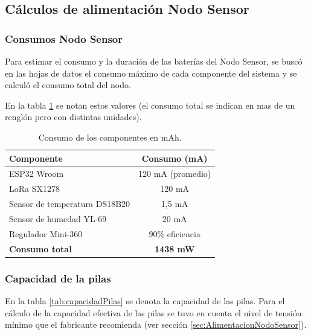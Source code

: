 \subsection{Cálculos de alimentación Nodo Sensor}
\subsubsection{Consumos Nodo Sensor}
Para estimar el consumo y la duración de las baterías del Nodo Sensor, se buscó en las hojas de datos el consumo máximo de cada componente del sistema y se calculó el consumo total del nodo. 

En la tabla \ref{tab:consumosNodo} se notan estos valores (el consumo total se indican en mas de un renglón pero con distintas unidades).


\begin{table}[h]
    \centering

    \begin{tabular}{@{}lc@{}}
        \toprule
        \textbf{Componente}            & \textbf{Consumo (mA)} \\ \midrule
        ESP32 Wroom                   & 120 mA (promedio)      \\ 
        LoRa SX1278                   & 120 mA                  \\ 
        Sensor de temperatura DS18B20  & 1,5 mA     \\ 
        Sensor de humedad YL-69        & 20 mA                  \\ 
        Regulador Mini-360             & 90\% eficiencia                  \\ \midrule
        \textbf{Consumo total}        & \textbf{1438 mW}     \\ \bottomrule
    \end{tabular}
    \caption{Consumo de los componentes en mAh.}
    \label{tab:consumosNodo}
\end{table}

\subsubsection{Capacidad de la pilas}
En la tabla \ref{tab:capacidadPilas} se denota la capacidad de las pilas. Para el cálculo de la capacidad efectiva de las pilas se tuvo en cuenta el nivel de tensión mínimo que el fabricante recomienda (ver sección \ref{sec:AlimentacionNodoSensor}). 

